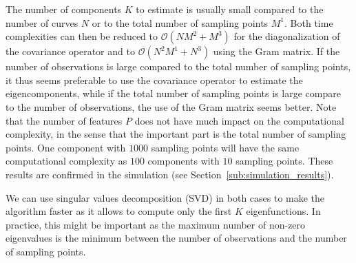The number of components $K$ to estimate is usually small compared to the number of curves $N$ or to the total number of sampling points $M^1$. Both time complexities can then be reduced to $\mathcal{O}(NM^2 + M^3)$ for the diagonalization of the covariance operator and to $\mathcal{O}(N^2M^1 + N^3)$ using the Gram matrix. If the number of observations is large compared to the total number of sampling points, it thus seems preferable to use the covariance operator to estimate the eigencomponents, while if the total number of sampling points is large compare to the number of observations, the use of the Gram matrix seems better. Note that the number of features $P$ does not have much impact on the computational complexity, in the sense that the important part is the total number of sampling points. One component with $1000$ sampling points will have the same computational complexity as $100$ components with $10$ sampling points. These results are confirmed in the simulation (see Section~\ref{sub:simulation_results}).

\begin{remark}
We can use singular values decomposition (SVD) in both cases to make the algorithm faster as it allows to compute only the first $K$ eigenfunctions. In practice, this might be important as the maximum number of non-zero eigenvalues is the minimum between the number of observations and the number of sampling points.
\end{remark}


